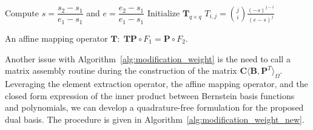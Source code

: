 \begin{algorithm}

	\BlankLine
	Compute $s = \dfrac{s_2-s_1}{e_1-s_1}$ and $e = \dfrac{e_2-s_1}{e_1-s_1}$\;
	Initialize $\mathbf{T}_{q\times q}$\;
	{
		{
			$T_{i,j}= \binom{j}{i}\frac{(-s)^{j-i}}{(e-s)^j}$
		}
	}
	\caption{An affine mapping operator $\mathbf{T}\colon\; \mathbf{T}\mathbf{P}\circ F_1=\mathbf{P}\circ F_2$.}\label{alg:affine_mapping}
\end{algorithm}

Another issue with Algorithm~\ref{alg:modification_weight} is the need to call a matrix assembly routine during the construction of the matrix $\mathbf{C}\langle{\mathbf{B},\mathbf{P}^T}\rangle_\Omega$. Leveraging the \Bezier element extraction operator, the affine mapping operator, and the closed form expression of the inner product between Bernstein basis functions and polynomials, we can develop a quadrature-free formulation for the proposed dual basis. The procedure is given in Algorithm~\ref{alg:modification_weight_new}.

